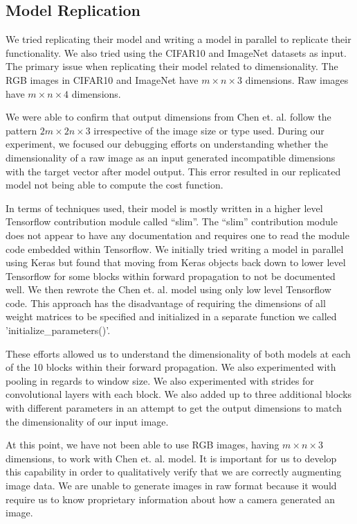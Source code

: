 \documentclass{article}
\begin{document}
\subsection{Model Replication}

We tried replicating their model and writing a model in parallel to
replicate their functionality. We also tried using the CIFAR10 and
ImageNet datasets as input. The primary issue when replicating their
model related to dimensionality. The RGB images in CIFAR10 and ImageNet
have $m \times n \times 3$ dimensions. Raw images have $m \times n \times 4$
dimensions.

We were able to confirm that output dimensions from Chen et. al.
\cite{chen2018learning} follow the pattern $2m \times 2n \times 3$
irrespective of the image size or type used. During our experiment,
we focused our debugging efforts on understanding whether the dimensionality
of a raw image as an input generated incompatible dimensions with the
target vector after model output. This error resulted in our replicated
model not being able to compute the cost function.

In terms of techniques used, their model is mostly written in a higher
level Tensorflow contribution module called ``slim''. The ``slim''
contribution module does not appear to have any documentation and requires
one to read the module code embedded within Tensorflow. We initially tried
writing a model in parallel using Keras but found that moving from Keras
objects back down to lower level Tensorflow for some blocks within
forward propagation to not be documented well. We then rewrote the
Chen et. al. \cite{chen2018learning} model using only low level Tensorflow
code. This approach has the disadvantage of requiring the dimensions of
all weight matrices to be specified and initialized in a separate function
we called 'initialize\_parameters()'.

These efforts allowed us to understand the dimensionality of both models
at each of the 10 blocks within their forward propagation. We also
experimented with pooling in regards to window size. We also experimented
with strides for convolutional layers with each block. We also added up
to three additional blocks with different parameters in an attempt to
get the output dimensions to match the dimensionality of our input image.

At this point, we have not been able to use RGB images, having
$m \times n \times 3$ dimensions, to work with Chen et. al.
\cite{chen2018learning} model. It is important for us to develop this
capability in order to qualitatively verify that we are correctly augmenting
image data. We are unable to generate images in raw format because
it would require us to know proprietary information about how a camera
generated an image.
\end{document}
